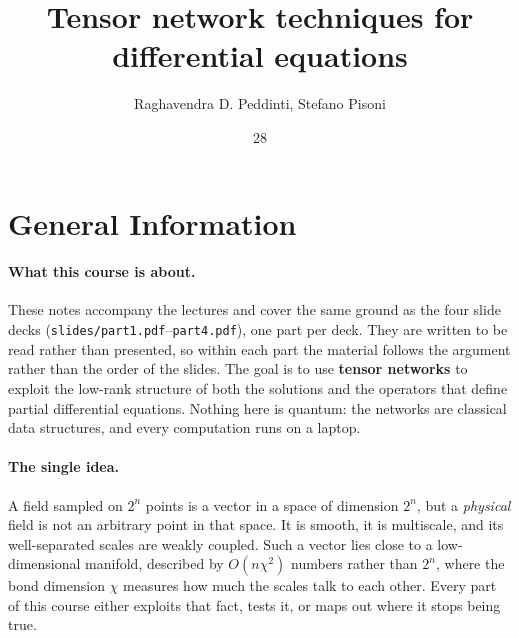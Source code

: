 \documentclass[english,course]{lecturenotes}
\title{Tensor network techniques for differential equations}
\author{Raghavendra D. Peddinti\affmark{1,*}, Stefano Pisoni\affmark{1,2}}
\date{28}{09}{2026}
\begin{document}
\clearpage
\section{General Information}
\label{sec:general-information}

\paragraph{What this course is about.}
These notes accompany the lectures and cover the same ground as the four slide
decks (\texttt{slides/part1.pdf}--\texttt{part4.pdf}), one part per deck. They
are written to be read rather than presented, so within each part the material
follows the argument rather than the order of the slides. The goal is to use
\textbf{tensor networks} to exploit the low-rank structure of both the
solutions and the operators that define partial differential equations. Nothing
here is quantum: the networks are classical data structures, and every
computation runs on a laptop.

\paragraph{The single idea.}
A field sampled on $2^n$ points is a vector in a space of dimension $2^n$, but a
\emph{physical} field is not an arbitrary point in that space. It is smooth, it
is multiscale, and its well-separated scales are weakly coupled. Such a vector
lies close to a low-dimensional manifold, described by $O(n\chi^2)$ numbers
rather than $2^n$, where the bond dimension $\chi$ measures how much the scales
talk to each other. Every part of this course either exploits that fact, tests
it, or maps out where it stops being true.
\end{document}
